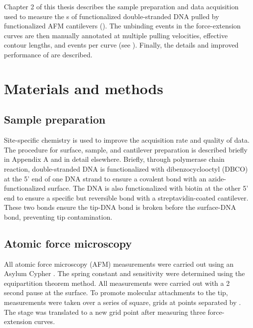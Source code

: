  Chapter 2 of this thesis describes the sample preparation and data acquisition used to measure the \fec{}s of functionalized double-stranded DNA pulled by functionalized AFM cantilevers ().  The unbinding events in the force-extension curves are then manually annotated at multiple pulling velocities, effective contour lengths, and events per curve (see ). Finally, the details and improved performance of \name{} are described. 

\chapter{Materials and methods}

\section{Sample preparation}

Site-specific chemistry is used to improve the acquisition rate and quality of data. The procedure for surface, sample, and cantilever preparation is described briefly in Appendix A and in detail elsewhere.\cite{walder_robert_rapid_nodate} Briefly, through polymerase chain reaction, double-stranded DNA is functionalized with dibenzocyclooctyl (DBCO) at the 5' end of one DNA strand to ensure a covalent bond with an azide-functionalized surface. The DNA is also functionalized with biotin at the other 5' end to ensure a specific but reversible bond with a streptavidin-coated cantilever. These two bonds ensure the tip-DNA bond is broken before the surface-DNA bond, preventing tip contamination. 

\section{Atomic force microscopy}

All atomic force microscopy (AFM) measurements were carried out using an Asylum Cypher . The spring constant and sensitivity were determined using the equipartition theorem method. All measurements were carried out with a 2 second pause at the surface. To promote molecular attachments to the tip, measurements were taken over a series of square,  grids at points separated by . The stage was translated to a new grid point after measuring three force-extension curves. 

